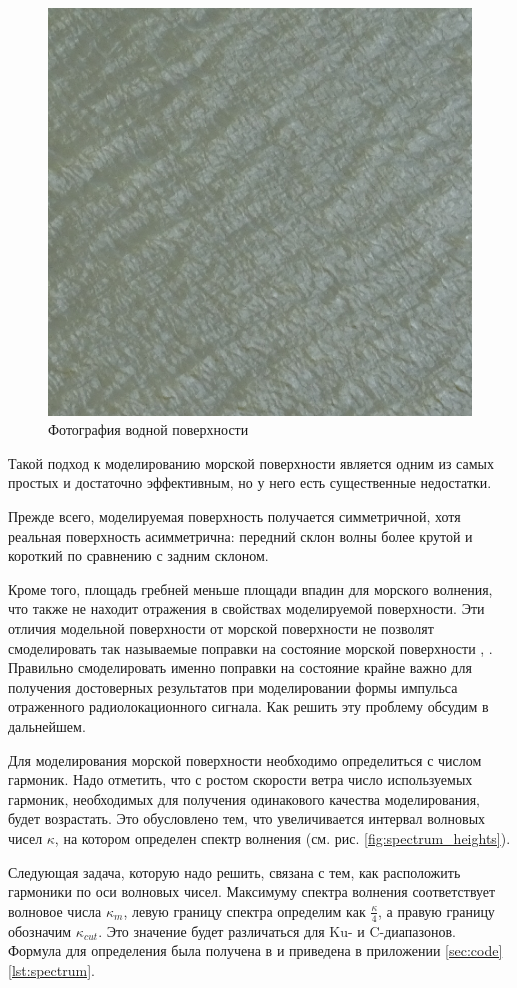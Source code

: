 \begin{figure}[h!]
    \centering
    \includegraphics[width=0.49\linewidth]{img/water_photo.png}
    \caption{Фотография водной поверхности}
    \label{fig:water_photo}
\end{figure}

Такой подход к моделированию морской поверхности является одним из самых простых и достаточно эффективным, но у него есть существенные недостатки.

Прежде всего, моделируемая поверхность получается симметричной, хотя реальная поверхность асимметрична: передний склон волны более крутой и короткий по сравнению с задним склоном.

Кроме того, площадь гребней меньше площади впадин для морского волнения, что
также не находит отражения в свойствах моделируемой поверхности. Эти отличия
модельной поверхности от морской поверхности не позволят смоделировать так
называемые поправки на состояние морской поверхности \cite{fu},
\cite{pustovoytenko}. 
Правильно смоделировать именно поправки на состояние крайне важно для получения
достоверных результатов при моделировании формы импульса
отраженного радиолокационного
сигнала. Как решить эту проблему обсудим в дальнейшем.


Для моделирования морской поверхности необходимо определиться с числом
гармоник. Надо отметить, что с ростом скорости ветра число используемых
гармоник, необходимых для получения одинакового качества моделирования, будет
возрастать. Это обусловлено тем, что увеличивается интервал волновых чисел
$\kappa$, на котором определен спектр волнения (см. рис.
\ref{fig:spectrum_heights}). 

Следующая задача, которую надо решить, связана с тем, как расположить гармоники
по оси волновых чисел. Максимуму спектра волнения соответствует волновое числа
$\kappa_m$, левую границу спектра определим как $\frac{\kappa}{4}$, а правую
границу обозначим $\kappa_{cut}$. Это значение будет различаться для Ku- и
C-диапазонов. Формула для определения была получена в \cite{karaev} и приведена  
в приложении \ref{sec:code}\ref{lst:spectrum}.


